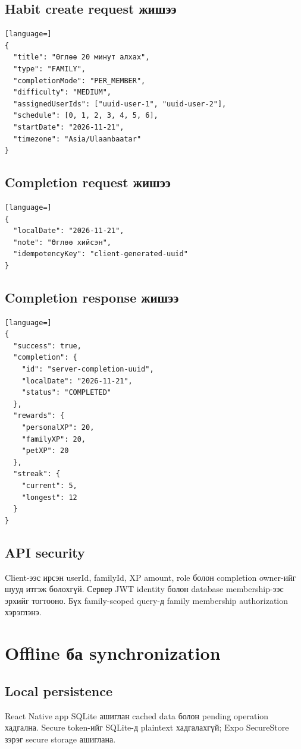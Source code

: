 \documentclass[12pt,a4paper,oneside]{report}
\begin{document}
\section{Habit create request жишээ}
\begin{lstlisting}[language=]
{
  "title": "Өглөө 20 минут алхах",
  "type": "FAMILY",
  "completionMode": "PER_MEMBER",
  "difficulty": "MEDIUM",
  "assignedUserIds": ["uuid-user-1", "uuid-user-2"],
  "schedule": [0, 1, 2, 3, 4, 5, 6],
  "startDate": "2026-11-21",
  "timezone": "Asia/Ulaanbaatar"
}
\end{lstlisting}

\section{Completion request жишээ}
\begin{lstlisting}[language=]
{
  "localDate": "2026-11-21",
  "note": "Өглөө хийсэн",
  "idempotencyKey": "client-generated-uuid"
}
\end{lstlisting}

\section{Completion response жишээ}
\begin{lstlisting}[language=]
{
  "success": true,
  "completion": {
    "id": "server-completion-uuid",
    "localDate": "2026-11-21",
    "status": "COMPLETED"
  },
  "rewards": {
    "personalXP": 20,
    "familyXP": 20,
    "petXP": 20
  },
  "streak": {
    "current": 5,
    "longest": 12
  }
}
\end{lstlisting}

\section{API security}
Client-ээс ирсэн userId, familyId, XP amount, role болон completion owner-ийг шууд итгэж болохгүй. Сервер JWT identity болон database membership-ээс эрхийг тогтооно. Бүх family-scoped query-д family membership authorization хэрэглэнэ.

\chapter{Offline ба synchronization}

\section{Local persistence}
React Native app SQLite ашиглан cached data болон pending operation хадгална. Secure token-ийг SQLite-д plaintext хадгалахгүй; Expo SecureStore зэрэг secure storage ашиглана.
\end{document}
